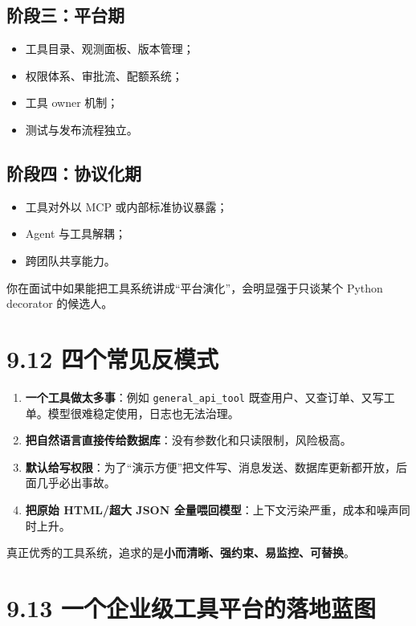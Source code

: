 \subsection{阶段三：平台期}

\begin{itemize}[leftmargin=2em]
\item 工具目录、观测面板、版本管理；
\item 权限体系、审批流、配额系统；
\item 工具 owner 机制；
\item 测试与发布流程独立。
\end{itemize}

\subsection{阶段四：协议化期}

\begin{itemize}[leftmargin=2em]
\item 工具对外以 MCP 或内部标准协议暴露；
\item Agent 与工具解耦；
\item 跨团队共享能力。
\end{itemize}

你在面试中如果能把工具系统讲成``平台演化''，会明显强于只谈某个 Python decorator 的候选人。


\section{9.12 四个常见反模式}

\begin{enumerate}[leftmargin=2em]
\item \textbf{一个工具做太多事}：例如 \texttt{general\_api\_tool} 既查用户、又查订单、又写工单。模型很难稳定使用，日志也无法治理。
\item \textbf{把自然语言直接传给数据库}：没有参数化和只读限制，风险极高。
\item \textbf{默认给写权限}：为了``演示方便''把文件写、消息发送、数据库更新都开放，后面几乎必出事故。
\item \textbf{把原始 HTML/超大 JSON 全量喂回模型}：上下文污染严重，成本和噪声同时上升。
\end{enumerate}

真正优秀的工具系统，追求的是\textbf{小而清晰、强约束、易监控、可替换}。


\section{9.13 一个企业级工具平台的落地蓝图}

